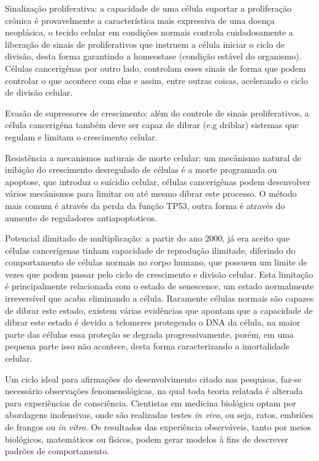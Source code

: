 \documentclass[12pt]{article}
\begin{document}
Sinalização proliferativa: a capacidade de uma célula suportar a proliferação crônica é provavelmente a característica mais expressiva de uma doença neoplásica, o tecido celular em condições normais controla cuidadosamente a liberação de sinais de proliferativos que instruem a célula iniciar o ciclo de divisão, desta forma garantindo a homeostase (condição estável do organismo).
Células cancerigênas por outro lado, controlam esses sinais de forma que podem controlar o que acontece com elas e assim, entre outras coisas, acelerando o ciclo de divisão celular.

Evasão de supressores de crescimento: além do controle de sinais proliferativos, a célula cancerigêna também deve ser capaz de dibrar (e.g driblar) sistemas que regulam e limitam o crescimento celular.

Resistência a mecanismos naturais de morte celular: um mecânismo natural de inibição do crescimento desregulado de células é a morte programada ou apoptose, que introduz o suícidio celular, células cancerigênas podem desenvolver vários mecânismos para limitar ou até mesmo dibrar este processo. O método mais comum é através da perda da função TP53, outra forma é através do aumento de reguladores antiapoptoticos.

Potencial ilimitado de multiplicação: a partir do ano 2000, já era aceito que células cancerígenas tinham capacidade de reprodução ilimitade, diferindo do comportamento de células normais no corpo humano, que possuem um limite de vezes que podem passar pelo ciclo de crescimento e divisão celular. Esta limitação é principalmente relacionada com o estado de senescence, um estado normalmente irreversível que acaba eliminando a célula. Raramente células normais são capazes de dibrar este estado, existem várias evidências que apontam que a capacidade de dibrar este estado é devido a telomeres protegendo o DNA da célula, na maior parte das células essa proteção se degrada progressivamente, porém, em uma pequena parte isso não acontece, desta forma caracterizando a imortalidade celular.





Um ciclo ideal para afirmações do desenvolvimento citado nas pesquisas, faz-se necessário observações fenomenológicas, na qual toda teoria relatada é alterada para experiências de consciência. Cientistas em medicina biológica optam por abordagens inofensivas, onde são realizadas testes \emph{in vivo}, ou seja, ratos, embriões de frangos ou \emph{in vitro}. Os resultados das experiência observáveis, tanto por meios biológicos, matemáticos ou físicos, podem gerar modelos à fins de descrever padrões de comportamento. 
\end{document}
